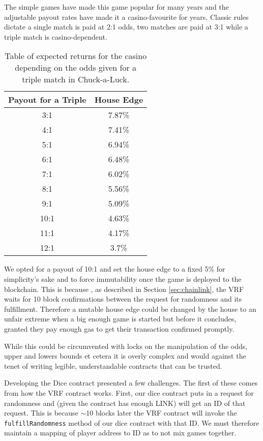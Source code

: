 \documentclass[10pt,journal,compsoc]{IEEEtran}
\begin{document}
The simple games have made this game popular for many years and the adjustable payout rates have made it a casino-favourite for years. Classic rules dictate a single match is paid at 2:1 odds, two matches are paid at 3:1 while a triple match is casino-dependent.

\begin{table}[!h]
    \centering
    \renewcommand{\arraystretch}{1.3}
    \caption{Table of expected returns for the casino depending on the odds given for a triple match in Chuck-a-Luck\cite{chuck_luck_wizard_of_odds}.}
    \label{tab:chuckaluck}
    \begin{tabular}{c c}
        \hline\hline
        Payout for a Triple & House Edge \\ 
        \hline
        3:1 & 7.87\% \\
        4:1 & 7.41\% \\
        5:1 & 6.94\% \\
        6:1 & 6.48\% \\
        7:1 & 6.02\% \\
        8:1 & 5.56\% \\
        9:1 & 5.09\% \\
        10:1 & 4.63\% \\
        11:1 & 4.17\% \\
        12:1 & 3.7\% \\
        \hline\hline
        
    \end{tabular}
\end{table}

We opted for a payout of 10:1 and set the house edge to a fixed 5\% for simplicity's sake and to force immutability once the game is deployed to the blockchain. This is because , as described in Section \ref{sec:chainlink}, the VRF waits for 10 block confirmations between the request for randomness and its fulfillment. Therefore a mutable house edge could be changed by the house to an unfair extreme when a big enough game is started but before it concludes, granted they pay enough gas to get their transaction confirmed promptly. 

While this could be circumvented with locks on the manipulation of the odds, upper and lowers bounds et cetera it is overly complex and would against the tenet of writing legible, understandable contracts that can be trusted.

Developing the Dice contract presented a few challenges. The first of these comes from how the VRF contract works. First, our dice contract puts in a request for randomness and (given the contract has enough LINK) will get an ID of that request. This is because $\sim$10 blocks later the VRF contract will invoke the \texttt{fulfillRandomness} method of our dice contract with that ID. We must therefore maintain a mapping of player address to ID as to not mix games together. 
\end{document}
